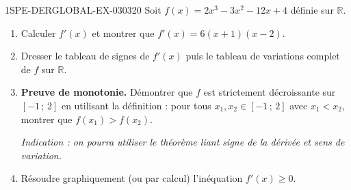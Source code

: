 \begin{exercice}{1SPE-DERGLOBAL-EX-030}{3}{20}
Soit $f(x) = 2x^3 - 3x^2 - 12x + 4$ définie sur $\mathbb{R}$.

\begin{enumerate}
\item Calculer $f'(x)$ et montrer que $f'(x) = 6(x+1)(x-2)$.
\item Dresser le tableau de signes de $f'(x)$ puis le tableau de variations complet de $f$ sur $\mathbb{R}$.
\item \textbf{Preuve de monotonie.} Démontrer que $f$ est strictement décroissante sur $[-1\,;\,2]$ en utilisant la définition : pour tous $x_1, x_2 \in [-1\,;\,2]$ avec $x_1 < x_2$, montrer que $f(x_1) > f(x_2)$.

\textit{Indication : on pourra utiliser le théorème liant signe de la dérivée et sens de variation.}
\item Résoudre graphiquement (ou par calcul) l'inéquation $f'(x) \geqslant 0$.
\end{enumerate}
\end{exercice}
